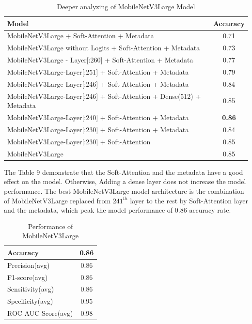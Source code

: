\documentclass[sensors,article,submit,pdftex,moreauthors]{Definitions/mdpi}
\begin{document}
\begin{table}[ht]
	\centering
	\begin{tabular}{|p{11cm} | c |}
		\hline
		Model & Accuracy\\
		\hline
		MobileNetV3Large + Soft-Attention + Metadata & 0.71 \\
		\hline
		MobileNetV3Large without Logits + Soft-Attention + Metadata  & 0.73 \\
		\hline
		MobileNetV3Large - Layer[:260] + Soft-Attention + Metadata  & 0.77 \\
		\hline
		MobileNetV3Large-Layer[:251] + Soft-Attention + Metadata  & 0.79 \\
		\hline
		MobileNetV3Large-Layer[:246] + Soft-Attention + Metadata  & 0.84 \\
		\hline
		MobileNetV3Large-Layer[:246] + Soft-Attention + Dense(512) + Metadata & 0.85 \\
		\hline
		MobileNetV3Large-Layer[:240] + Soft-Attention + Metadata  & \textbf{0.86}\\
		\hline
		MobileNetV3Large-Layer[:230] + Soft-Attention + Metadata  & 0.84 \\
		\hline
		MobileNetV3Large-Layer[:230] + Soft-Attention & 0.85 \\ 
		\hline
		MobileNetV3Large & 0.85 \\ 
		\hline
	\end{tabular}
	\caption{Deeper analyzing of MobileNetV3Large Model}
	\label{table:8}
\end{table}

The Table 9 demonstrate that the Soft-Attention and the metadata have a good effect on the model. Otherwise, Adding a dense layer does not increase the model performance. The best MobileNetV3Large model architecture is the combination of MobileNetV3Large replaced from $241^{th}$ layer to the rest by Soft-Attention layer and the metadata, which peak the model performance of $0.86$ accuracy rate. 

\begin{table}[ht]
	\centering
	\begin{tabular}{| l | c |}
		\hline
		Accuracy & 0.86\\
		\hline
		Precision(avg) & 0.86\\
		\hline
		F1-score(avg) & 0.86\\
		\hline
		Sensitivity(avg) & 0.86\\
		\hline
		Specificity(avg) & 0.95\\
		\hline
		ROC AUC Score(avg) & 0.98\\
		\hline
	\end{tabular}
	\caption{Performance of MobileNetV3Large}
	\label{table:9}
\end{table}
\end{document}
